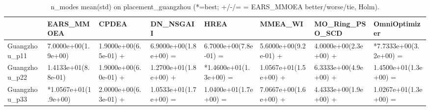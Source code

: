 \begin{table}[t]
\centering
\caption{n_modes mean(std) on placement_guangzhou (*=best; +/-/= = EARS_MMOEA better/worse/tie, Holm).}
\label{tab:placement_guangzhou_n_modes}
\begin{tabular}{llllllll}
\toprule
 & EARS\_MMOEA & CPDEA & DN\_NSGAII & HREA & MMEA\_WI & MO\_Ring\_PSO\_SCD & OmniOptimizer \\
\midrule
Guangzhou\_p11 & 7.0000e+00(1.9e+00) & 1.9000e+00(6.5e-01) + & 6.9000e+00(1.8e+00) = & 6.7000e+00(7.8e-01) = & 5.6000e+00(9.2e-01) + & 4.0000e+00(2.3e+00) + & *7.7333e+00(3.2e+00) = \\
Guangzhou\_p22 & 1.4133e+01(8.8e-01) & 1.9000e+00(6.0e-01) + & 1.2700e+01(1.8e+00) + & *1.4600e+01(1.3e+00) = & 1.0567e+01(1.5e+00) + & 6.3333e+00(4.9e+00) + & 1.4500e+01(1.3e+00) = \\
Guangzhou\_p33 & *1.0567e+01(1.9e+00) & 2.0000e+00(6.3e-01) + & 1.0533e+01(1.7e+00) = & 1.0400e+01(1.7e+00) = & 7.0667e+00(1.6e+00) + & 4.4333e+00(1.9e+00) + & 1.0267e+01(1.3e+00) = \\
\bottomrule
\end{tabular}
\end{table}
